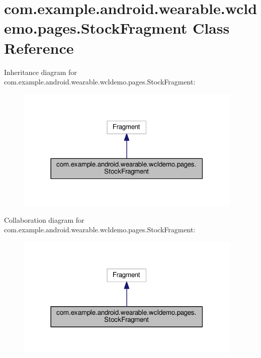 \hypertarget{classcom_1_1example_1_1android_1_1wearable_1_1wcldemo_1_1pages_1_1StockFragment}{}\section{com.\+example.\+android.\+wearable.\+wcldemo.\+pages.\+Stock\+Fragment Class Reference}
\label{classcom_1_1example_1_1android_1_1wearable_1_1wcldemo_1_1pages_1_1StockFragment}


Inheritance diagram for com.\+example.\+android.\+wearable.\+wcldemo.\+pages.\+Stock\+Fragment\+:
\nopagebreak
\begin{figure}[H]
\begin{center}
\leavevmode
\includegraphics[width=306pt]{d4/daf/classcom_1_1example_1_1android_1_1wearable_1_1wcldemo_1_1pages_1_1StockFragment__inherit__graph}
\end{center}
\end{figure}


Collaboration diagram for com.\+example.\+android.\+wearable.\+wcldemo.\+pages.\+Stock\+Fragment\+:
\nopagebreak
\begin{figure}[H]
\begin{center}
\leavevmode
\includegraphics[width=306pt]{d1/dae/classcom_1_1example_1_1android_1_1wearable_1_1wcldemo_1_1pages_1_1StockFragment__coll__graph}
\end{center}
\end{figure}
